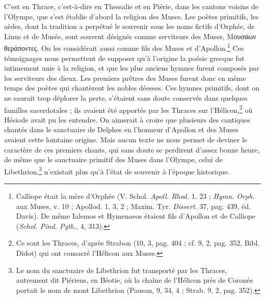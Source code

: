 \documentclass[a4paper, 11pt, oneside, polutonikogreek, french]{article}
\begin{document}
C'est en Thrace, c'est-à-dire en Thessalie et en Piérie, dans les cantons voisins de l'Olympe, que s'est établie d'abord la religion des Muses. Les poètes primitifs, les aèdes, dont la tradition a perpétué le souvenir sous les noms fictifs d'Orphée, de Linus et de Musée, sont souvent désignés comme serviteurs des Muses, Μουσάων θεράποντες. On les considérait aussi comme fils des Muses et d'Apollon.\footnote{Calliope était la mère d'Orphée (V. Schol. \emph{Apoll. Rhod.} 1, 23 ; \emph{Hymn. Orph.} aux Muses, v. 10 ; Apollod. 1, 3, 2 ; Maxim. Tyr. \emph{Dissert.} 37, pag. 439, éd. Davis). De même Ialemos et Hymenaeos étaient fils d'Apollon et de Calliope (\emph{Schol. Pind. Pyth.}, 4, 313).} Ces témoignages nous permettent de supposer qu'à l'origine la poésie grecque fut intimement unie à la religion, et que les plus anciens hymnes furent composés par les serviteurs des dieux. Les premiers prêtres des Muses furent donc en même temps des poètes qui chantèrent les nobles déesses. Ces hymnes primitifs, dont on ne saurait trop déplorer la perte, s'étaient sans doute conservés dans quelques familles sacerdotales ; ils avaient été apportés par les Thraces sur l'Hélicon,\footnote{Ce sont les Thraces, d'après Strabon (10, 3, pag. 404 ; cf. 9, 2, pag. 352, Bibl. Didot) qui ont consacré l'Hélicon aux Muses.} où Hésiode avait pu les entendre. On aimerait à croire que plusieurs des cantiques chantés dans le sanctuaire de Delphes en l'honneur d'Apollon et des Muses avaient cette lointaine origine. Mais aucun texte ne nous permet de deviner le caractère de ces premiers chants, qui sans doute se perdirent d'assez bonne heure, de même que le sanctuaire primitif des Muses dans l'Olympe, celui de Libethrion,\footnote{Le nom du sanctuaire de Libethrion fut transporté par les Thraces, autrement dit Piériens, en Béotie, où la chaîne de l'Hélicon près de Coronée portait le nom de mont Libethrion (Pausan, 9, 34, 4 ; Strab. 9, 2, pag. 352).} n'existait plus qu'à l'état de souvenir à l'époque historique.
\end{document}

